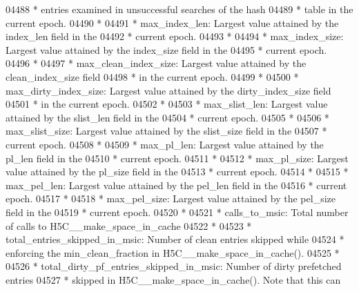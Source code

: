 \begin{DoxyCode}
04488 \textcolor{comment}{ *              entries examined in unsuccessful searches of the hash}
04489 \textcolor{comment}{ *      table in the current epoch.}
04490 \textcolor{comment}{ *}
04491 \textcolor{comment}{ * max\_index\_len:  Largest value attained by the index\_len field in the}
04492 \textcolor{comment}{ *              current epoch.}
04493 \textcolor{comment}{ *}
04494 \textcolor{comment}{ * max\_index\_size:  Largest value attained by the index\_size field in the}
04495 \textcolor{comment}{ *              current epoch.}
04496 \textcolor{comment}{ *}
04497 \textcolor{comment}{ * max\_clean\_index\_size: Largest value attained by the clean\_index\_size field}
04498 \textcolor{comment}{ *      in the current epoch.}
04499 \textcolor{comment}{ *}
04500 \textcolor{comment}{ * max\_dirty\_index\_size: Largest value attained by the dirty\_index\_size field}
04501 \textcolor{comment}{ *      in the current epoch.}
04502 \textcolor{comment}{ *}
04503 \textcolor{comment}{ * max\_slist\_len:  Largest value attained by the slist\_len field in the}
04504 \textcolor{comment}{ *              current epoch.}
04505 \textcolor{comment}{ *}
04506 \textcolor{comment}{ * max\_slist\_size:  Largest value attained by the slist\_size field in the}
04507 \textcolor{comment}{ *              current epoch.}
04508 \textcolor{comment}{ *}
04509 \textcolor{comment}{ * max\_pl\_len:  Largest value attained by the pl\_len field in the}
04510 \textcolor{comment}{ *              current epoch.}
04511 \textcolor{comment}{ *}
04512 \textcolor{comment}{ * max\_pl\_size: Largest value attained by the pl\_size field in the}
04513 \textcolor{comment}{ *              current epoch.}
04514 \textcolor{comment}{ *}
04515 \textcolor{comment}{ * max\_pel\_len: Largest value attained by the pel\_len field in the}
04516 \textcolor{comment}{ *              current epoch.}
04517 \textcolor{comment}{ *}
04518 \textcolor{comment}{ * max\_pel\_size: Largest value attained by the pel\_size field in the}
04519 \textcolor{comment}{ *              current epoch.}
04520 \textcolor{comment}{ *}
04521 \textcolor{comment}{ * calls\_to\_msic: Total number of calls to H5C\_\_make\_space\_in\_cache}
04522 \textcolor{comment}{ *}
04523 \textcolor{comment}{ * total\_entries\_skipped\_in\_msic: Number of clean entries skipped while}
04524 \textcolor{comment}{ *              enforcing the min\_clean\_fraction in H5C\_\_make\_space\_in\_cache().}
04525 \textcolor{comment}{ *}
04526 \textcolor{comment}{ * total\_dirty\_pf\_entries\_skipped\_in\_msic: Number of dirty prefetched entries}
04527 \textcolor{comment}{ *              skipped in H5C\_\_make\_space\_in\_cache().  Note that this can }

\end{DoxyCode}
